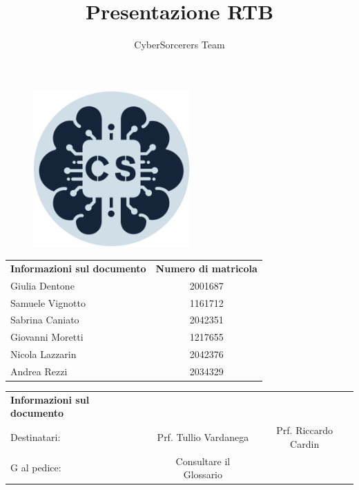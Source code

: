 \documentclass{article}
\title{\Huge{\textbf{Presentazione RTB}}\vspace{-1em}}
\author{CyberSorcerers Team}
\date{}
\begin{document}
\maketitle
\vspace{-3em}
\begin{figure}[h]
  \centering
  \includegraphics[width=6cm, height=6cm]{documenti/logo rotondo.png}
  \label{fig:immagine}
\end{figure}

\begin{center}
    \begin{tabular}{l c }
        \rowcolor{Blue} 
        \textbf{Informazioni sul documento} & \textbf{Numero di matricola} \\ [1 ex]
        \rowcolor{LighterBlue}
        Giulia Dentone & 2001687\\ [1 ex]
        \rowcolor{LightBlue}
        Samuele Vignotto & 1161712 \\ [1 ex]
        \rowcolor{LighterBlue}
        Sabrina Caniato & 2042351\\ [1 ex]
        \rowcolor{LightBlue}
        Giovanni Moretti & 1217655 \\ [1 ex]
        \rowcolor{LighterBlue}
        Nicola Lazzarin & 2042376\\ [1 ex]
        \rowcolor{LightBlue}
        Andrea Rezzi & 2034329\\ [1 ex]
    \end{tabular}
\end{center}


\begin{center}
    \begin{tabular}{l c c}
        \rowcolor{Blue} 
        \textbf{Informazioni sul documento} & &\\ [1 ex]
        \rowcolor{LighterBlue}
        Destinatari: & Prf. Tullio Vardanega & Prf. Riccardo Cardin \\ [1 ex]
        \rowcolor{LightBlue}
        G al pedice: & Consultare il Glossario & \\ [1 ex]
    \end{tabular}
\end{center}
\newpage
\end{document}

